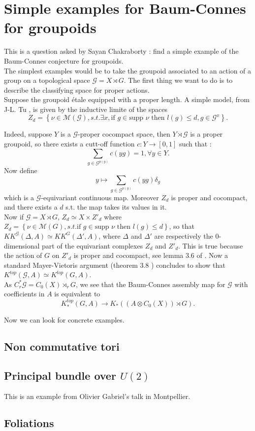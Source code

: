\section{Simple examples for Baum-Connes for groupoids}

This is a question asked by Sayan Chakraborty : find a simple example of the Baum-Connes conjecture for groupoids.\\

The simplest examples would be to take the groupoid associated to an action of a group on a topological space $\mathcal G = X\rtimes G$. The first thing we want to do is to describe the classifying space for proper actions.\\

Suppose the groupoid étale equipped with a proper length. A simple model, from J-L. Tu \cite{TuBC2}, is given by the inductive limite of the spaces
\[Z_d=\left\{\nu \in \mathcal M(\mathcal G), s.t. \exists x,\text{if } g\in \text{supp }\nu \text{ then } l(g)\leq d , g\in \mathcal G^x\right\}.\]

Indeed, suppose $Y$ is a $\mathcal G$-proper cocompact space, then $Y\rtimes \mathcal G$ is a proper groupoid, so there exists a cutt-off function $c : Y\rightarrow [0,1]$ such that : 
\[\sum_{g\in \mathcal G^{p(y)}} c(yg) = 1,\forall y \in Y.\]
Now define \[y \mapsto \sum_{g\in \mathcal G^{p(y)}} c(yg)\delta_g\]
which is a $\mathcal G$-equivariant continuous map. Moreover $Z_d$ is proper and cocompact, and there exists a $d$ s.t. the map takes its values in it.\\

Now if $\mathcal G = X\rtimes G$, $Z_d \simeq X\times Z'_d$ where $Z_d= \left\{ \nu \in \mathcal M(G), s.t. \text{if } g\in \text{supp }\nu \text{ then } l(g)\leq d\right\}$, so that
$KK^{\mathcal G}(\Delta,A)\simeq KK^G(\Delta', A)$, where $\Delta$ and $\Delta'$ are respectively the $0$-dimensional part of the equivariant complexes $Z_d$ and $Z'_d$. This is true because the action of $G$ on $Z'_d$ is proper and cocompact, see lemma $3.6$ of \cite{TuBC2}. Now a standard Mayer-Vietoris argument (theorem $3.8$ \cite{TuBC2}) concludes to show that 
$K^{top}(\mathcal G,A)\simeq K^{top}(G,A)$.\\

As $C^*_r \mathcal G = C_0(X)\rtimes_r G$, we see that the Baum-Connes assembly map for $\mathcal G$ with coefficients in $A$ is equivalent to 
\[K_*^{top}(G,A)\rightarrow K_*((A\otimes C_0(X))\rtimes G).\]

Now we can look for concrete examples.
\subsection{Non commutative tori}
\subsection{Principal bundle over $U(2)$}
This is an example from Olivier Gabriel's talk in Montpellier. 

\subsection{Foliations}
